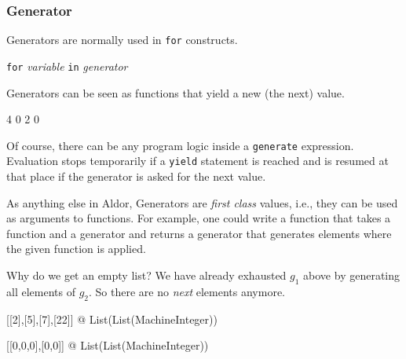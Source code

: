 \begin{frame}[fragile]
  \frametitle<presentation>{Generator}

Generators are normally used in \texttt{for} constructs.
\begin{center}
  \texttt{for} \textit{variable} \texttt{in} \textit{generator}
\end{center}

Generators can be seen as functions that yield a new (the next)
value.


\begin{myverbatim}
4 0 2 0
\end{myverbatim}
\end{frame}
Of course, there can be any program logic inside a \texttt{generate}
expression. Evaluation stops temporarily if a \texttt{yield} statement
is reached and is resumed at that place if the generator is asked for
the next value.

As anything else in Aldor, Generators are \emph{first class} values,
i.e., they can be used as arguments to functions.
For example, one could write a function that takes a function and a
generator and returns a generator that generates elements where the
given function is applied.
Why do we get an empty list? We have already exhausted $g_1$ above by
generating all elements of $g_2$. So there are no \emph{next} elements
anymore.
\begin{myverbatim}
[[2],[5],[7],[22]] @ List(List(MachineInteger))

[[0,0,0],[0,0]] @ List(List(MachineInteger))
\end{myverbatim}


